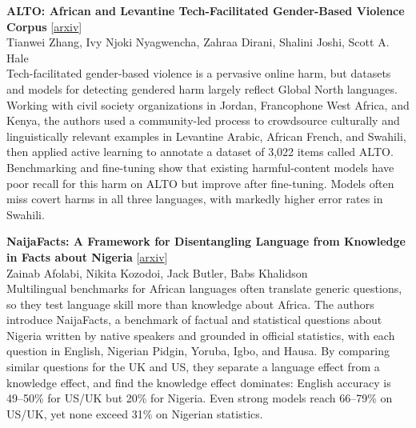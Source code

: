 \documentclass[12pt,letterpaper]{article}
\begin{document}
\medskip

\begin{minipage}{\linewidth}
{\small\textbf{ALTO: African and Levantine Tech-Facilitated Gender-Based Violence Corpus}} {\scriptsize[\href{https://arxiv.org/abs/2611.06706}{arxiv}]}\\
{\scriptsize Tianwei Zhang, Ivy Njoki Nyagwencha, Zahraa Dirani, Shalini Joshi, Scott A. Hale}\\


{\footnotesize Tech-facilitated gender-based violence is a pervasive online harm, but datasets and models for detecting gendered harm largely reflect Global North languages. Working with civil society organizations in Jordan, Francophone West Africa, and Kenya, the authors used a community-led process to crowdsource culturally and linguistically relevant examples in Levantine Arabic, African French, and Swahili, then applied active learning to annotate a dataset of 3,022 items called ALTO. Benchmarking and fine-tuning show that existing harmful-content models have poor recall for this harm on ALTO but improve after fine-tuning. Models often miss covert harms in all three languages, with markedly higher error rates in Swahili.}

\end{minipage}

\medskip

\begin{minipage}{\linewidth}
{\small\textbf{NaijaFacts: A Framework for Disentangling Language from Knowledge in Facts about Nigeria}} {\scriptsize[\href{https://arxiv.org/abs/2611.06504}{arxiv}]}\\
{\scriptsize Zainab Afolabi, Nikita Kozodoi, Jack Butler, Babs Khalidson}\\


{\footnotesize Multilingual benchmarks for African languages often translate generic questions, so they test language skill more than knowledge about Africa. The authors introduce NaijaFacts, a benchmark of factual and statistical questions about Nigeria written by native speakers and grounded in official statistics, with each question in English, Nigerian Pidgin, Yoruba, Igbo, and Hausa. By comparing similar questions for the UK and US, they separate a language effect from a knowledge effect, and find the knowledge effect dominates: English accuracy is 49--50\% for US/UK but 20\% for Nigeria. Even strong models reach 66--79\% on US/UK, yet none exceed 31\% on Nigerian statistics.}

\end{minipage}
\end{document}
